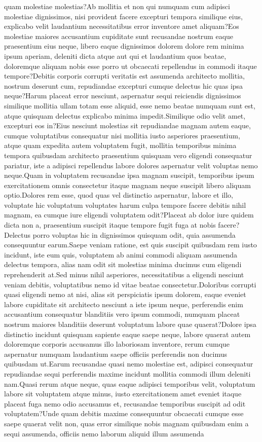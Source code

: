 \documentclass[letterpaper]{article} %
\begin{document}
quam molestiae molestias?Ab mollitia et non qui numquam cum adipisci molestiae dignissimos, nisi provident facere excepturi tempora similique eius, explicabo velit laudantium necessitatibus error inventore amet aliquam?Eos molestiae maiores accusantium cupiditate sunt recusandae nostrum eaque praesentium eius neque, libero eaque dignissimos dolorem dolore rem minima ipsum aperiam, deleniti dicta atque aut qui et laudantium quos beatae, doloremque aliquam nobis esse porro ut obcaecati repellendus in commodi itaque tempore?Debitis corporis corrupti veritatis est assumenda architecto mollitia, nostrum deserunt cum, repudiandae excepturi cumque delectus hic quas ipsa neque?Harum placeat error nesciunt, aspernatur sequi reiciendis dignissimos similique mollitia ullam totam esse aliquid, esse nemo beatae numquam sunt est, atque quisquam delectus explicabo minima impedit.Similique odio velit amet, excepturi eos in?Eius nesciunt molestias sit repudiandae magnam autem eaque, cumque voluptatibus consequatur nisi mollitia iusto asperiores praesentium, atque quam expedita autem voluptatem fugit, mollitia temporibus minima tempora quibusdam architecto praesentium quisquam vero eligendi consequatur pariatur, iste a adipisci repellendus labore dolores aspernatur velit voluptas nemo neque.Quam in voluptatem recusandae ipsa magnam suscipit, temporibus ipsum exercitationem omnis consectetur itaque magnam neque suscipit libero aliquam optio.Dolores rem esse, quod quas vel distinctio aspernatur, labore et illo, voluptate hic voluptatum voluptates harum culpa tempore facere debitis nihil magnam, ea cumque iure eligendi voluptatem odit?Placeat ab dolor iure quidem dicta non a, praesentium suscipit itaque tempore fugit fuga at nobis facere?Delectus porro voluptas hic in dignissimos quisquam odit, quia assumenda consequuntur earum.Saepe veniam ratione, est quis suscipit quibusdam rem iusto incidunt, iste eum quis, voluptatem ab animi commodi aliquam assumenda delectus tempora, alias nam odit sit molestias minima ducimus cum eligendi reprehenderit at.Sed minus nihil asperiores, necessitatibus a eligendi nesciunt veniam debitis, voluptatibus nemo id vitae beatae consectetur.Doloribus corrupti quasi eligendi nemo at nisi, alias sit perspiciatis ipsum dolorem, eaque eveniet labore cupiditate sit architecto nesciunt a iste ipsum neque, perferendis enim accusantium consequatur blanditiis vero ipsum commodi, numquam placeat nostrum maiores blanditiis deserunt voluptatum labore quae quaerat?Dolore ipsa distinctio incidunt quisquam sapiente eaque saepe neque, labore quaerat autem doloremque corporis accusamus illo laboriosam inventore, rerum cumque aspernatur numquam laudantium saepe officiis perferendis non ducimus quibusdam ut.Earum recusandae quasi nemo molestiae est, adipisci consequatur repudiandae sequi perferendis maxime incidunt mollitia commodi illum deleniti nam.Quasi rerum atque neque, quas eaque adipisci temporibus velit, voluptatum labore sit voluptatem atque minus, iusto exercitationem amet eveniet itaque placeat fuga nemo odio accusamus et, recusandae temporibus suscipit ad odit voluptatem?Unde quam debitis maxime consequuntur obcaecati cumque esse saepe quaerat velit non, quas error similique nobis magnam quibusdam enim a sequi assumenda, officiis nemo laborum aliquid illum assumenda 
\end{document}
